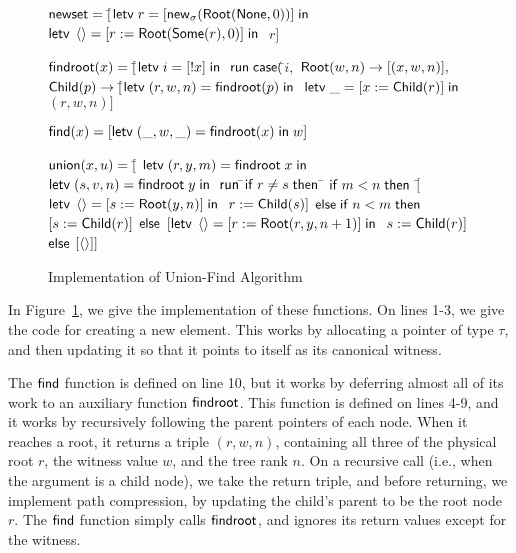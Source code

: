 \begin{figure}
\mbox{}
\begin{specification}
\nextline $\mathsf{newset} = [$\=$\mathsf{letv}\;r = [\mathsf{new}_{\sigma}(\mathsf{Root}(\mathsf{None}, 0))]\;\mathsf{in}\;$
\nextline              \>$\mathsf{letv}\;\left<\right> = [r := \mathsf{Root}(\mathsf{Some}(r), 0)]\;\mathsf{in}\;$
\nextline              \>$r]$

\nextline[1em] $\mathsf{findroot}(x) = [$\=$
                  \mathsf{letv}\;i = [!x]\;\mathsf{in}\;$ 
\nextline \>     $\mathsf{run}\;{}\mathsf{case}($\=$i,$ 
\nextline \> \>     $\mathsf{Root}(w, n) \to [(x, w, n)],$
\nextline \> \>     $\mathsf{Child}(p) \to [$\=$\mathsf{letv}\;(r, w, n) = \mathsf{findroot}(p)\;\mathsf{in}\;$ 
\nextline \> \>                      \>$\mathsf{letv}\;\_ = [x := \mathsf{Child}(r)]\;\mathsf{in}\;$ 
\nextline \> \>                      \>$(r,w,n)]$

\nextline[1em] $\mathsf{find}(x) = [\mathsf{letv}\;(\_, w, \_) = \mathsf{findroot}(x)\;\mathsf{in}\;w]$ 

\nextline[1em] $\mathsf{union}(x, u) = [$\= 
             $\mathsf{letv}\;(r, y, m) = \mathsf{findroot}\;x\;\mathsf{in}\;$ 
\nextline \> $\mathsf{letv}\;(s, v, n) = \mathsf{findroot}\;y\;\mathsf{in}\;$ 
\nextline \> $\mathsf{run}\;{}$\=$\mathsf{if}\;r \not= s\;\mathsf{then}$ 
\nextline \>\>\;\;\=   $\mathsf{if}\;m < n\;\mathsf{then}$ 
\nextline \>\> \>   \;\;$[$\=$\mathsf{letv}\;\left<\right> = [s := \mathsf{Root}(y, n)]\;\mathsf{in}\;$ 
\nextline \>\> \>         \>$r := \mathsf{Child}(s)]$ 
\nextline \>\> \> $\mathsf{else}\;\mathsf{if}\;n < m\;\mathsf{then}$ 
\nextline \>\> \>   \;\;$[s := \mathsf{Child}(r)]$
\nextline \>\> \> $\mathsf{else}$ 
\nextline \>\> \>   \;\;$[\mathsf{letv}\;\left<\right> = [r := \mathsf{Root}(r, y, n+1)]\;\mathsf{in}\;$
\nextline \>\> \>      \>$s := \mathsf{Child}(r)]$
\nextline \>\> $\mathsf{else}$ 
\nextline \>\> \> $[\left<\right>]]$
\end{specification}
\caption{Implementation of Union-Find Algorithm}
\label{union-find:impl}  
\end{figure}

In Figure~\ref{union-find:impl}, we give the implementation of these functions. 
On lines 1-3, we give the code for creating a new element. This works by allocating
a pointer of type $\tau$, and then updating it so that it points to itself as its
canonical witness. 

The $\mathsf{find}$ function is defined on line 10, but it works by deferring
almost all of its work to an auxiliary function $\mathsf{findroot}$. This
function is defined on lines 4-9, and it works by recursively
following the parent pointers of each node. When it reaches a root, it
returns a triple $(r, w, n)$, containing all three of the physical
root $r$, the witness value $w$, and the tree rank $n$. On a
recursive call (i.e., when the argument is a child node), we take the
return triple, and before returning, we implement path compression, by
updating the child's parent to be the root node $r$.  The $\mathsf{find}$
function simply calls $\mathsf{findroot}$, and ignores its return values
except for the witness.

